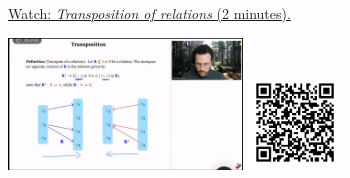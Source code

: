 
\begin{minipage}{10cm}
    \href{https://act4e-spring21.netlify.app/videos/spring2021-relations:relations:trans-rel.html}{Watch: \emph{Transposition of relations} (2 minutes).}
        
    \href{https://act4e-spring21.netlify.app/videos/spring2021-relations:relations:trans-rel.html}{\includegraphics[height=3.5cm]{spring2021-relations:relations:trans-rel/thumbnails.jpg}}
    \href{https://act4e-spring21.netlify.app/videos/spring2021-relations:relations:trans-rel.html}{\includegraphics[height=2.5cm]{spring2021-relations:relations:trans-rel/qrcode.png}}
\end{minipage}
